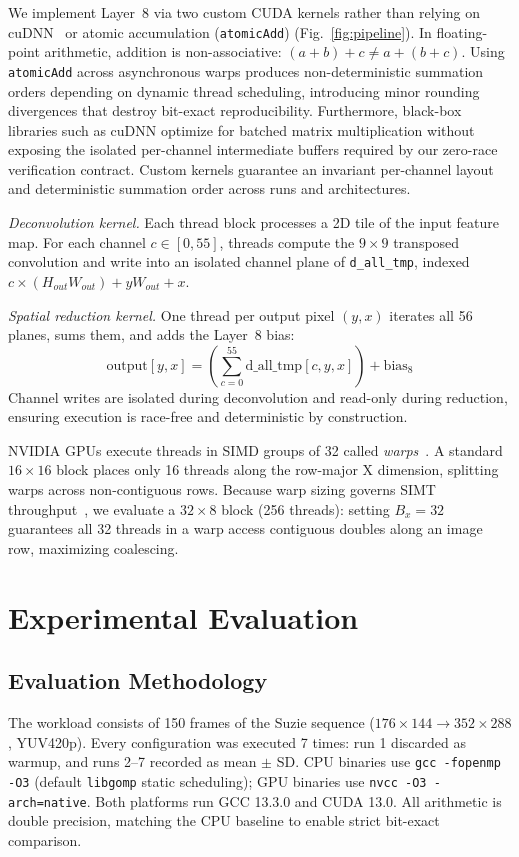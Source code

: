 \documentclass[conference]{IEEEtran}
\begin{document}
We implement Layer~8 via two custom CUDA kernels rather than relying on cuDNN~\cite{chetlur2014cudnn} or atomic accumulation (\texttt{atomicAdd}) (Fig.~\ref{fig:pipeline}). In floating-point arithmetic, addition is non-associative: $(a + b) + c \neq a + (b + c)$. Using \texttt{atomicAdd} across asynchronous warps produces non-deterministic summation orders depending on dynamic thread scheduling, introducing minor rounding divergences that destroy bit-exact reproducibility. Furthermore, black-box libraries such as cuDNN optimize for batched matrix multiplication without exposing the isolated per-channel intermediate buffers required by our zero-race verification contract. Custom kernels guarantee an invariant per-channel layout and deterministic summation order across runs and architectures.

\emph{Deconvolution kernel.} Each thread block processes a 2D tile of the input feature map. For each channel $c \in [0,55]$, threads compute the $9{\times}9$ transposed convolution and write into an isolated channel plane of \texttt{d\_all\_tmp}, indexed $c \times (H_{out}W_{out}) + yW_{out} + x$.

\emph{Spatial reduction kernel.} One thread per output pixel $(y,x)$ iterates all 56 planes, sums them, and adds the Layer~8 bias:
\begin{equation}
\text{output}[y, x] = \left( \sum_{c=0}^{55} \text{d\_all\_tmp}[c, y, x] \right) + \text{bias}_8
\label{eq:spatial_reduction}
\end{equation}
Channel writes are isolated during deconvolution and read-only during reduction, ensuring execution is race-free and deterministic by construction.

NVIDIA GPUs execute threads in SIMD groups of 32 called \emph{warps}~\cite{nvidiacudaguide}. A standard $16{\times}16$ block places only 16 threads along the row-major X dimension, splitting warps across non-contiguous rows. Because warp sizing governs SIMT throughput~\cite{lashgar2012warpresize}, we evaluate a $32{\times}8$ block (256 threads): setting $B_x=32$ guarantees all 32 threads in a warp access contiguous doubles along an image row, maximizing coalescing.

\section{Experimental Evaluation}

\subsection{Evaluation Methodology}
\label{sec:methodology}
The workload consists of 150 frames of the Suzie sequence ($176{\times}144 \rightarrow 352{\times}288$, YUV420p). Every configuration was executed 7 times: run 1 discarded as warmup, and runs 2--7 recorded as mean $\pm$ SD. CPU binaries use \texttt{gcc -fopenmp -O3} (default \texttt{libgomp} static scheduling); GPU binaries use \texttt{nvcc -O3 -arch=native}. Both platforms run GCC 13.3.0 and CUDA 13.0. All arithmetic is double precision, matching the CPU baseline to enable strict bit-exact comparison.
\end{document}
